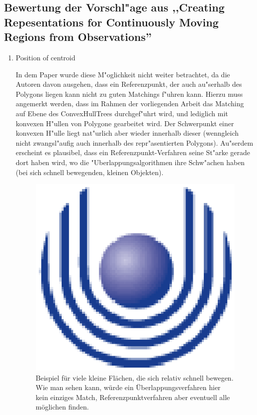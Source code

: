 \subsection[Bewertung der Vorschl"age aus \cite{TG}]{Bewertung der Vorschl"age aus ,,Creating Repesentations for Continuously Moving Regions from Observations''\cite{TG}}
\begin{enumerate}
\item Position of centroid

In dem Paper wurde diese M"oglichkeit nicht weiter betrachtet, da die Autoren davon ausgehen, dass ein Referenzpunkt, der auch au"serhalb des Polygons liegen kann nicht zu guten Matchings f"uhren kann. Hierzu muss angemerkt werden, dass im Rahmen der vorliegenden Arbeit das Matching auf Ebene des ConvexHullTrees durchgef"uhrt wird, und lediglich mit konvexen H"ullen von Polygone gearbeitet wird. Der Schwerpunkt einer konvexen H"ulle liegt nat"urlich aber wieder innerhalb dieser (wenngleich nicht zwangsl"aufig auch innerhalb des repr"asentierten Polygons). Au"serdem erscheint es plausibel, dass ein Referenzpunkt-Verfahren seine St"arke gerade dort haben wird, wo die "Uberlappungsalgorithmen ihre Schw"achen haben (bei sich schnell bewegenden, kleinen Objekten).

\begin{figure}
	\centering
	\includegraphics{feu_logo2.eps}
	\caption[Beispiel für den Vorteil von Referenzpunktverfahren]{Beispiel für viele kleine Flächen, die sich relativ schnell bewegen. Wie man sehen kann, würde ein Überlappungsverfahren hier kein einziges Match, Referenzpunktverfahren aber eventuell alle möglichen finden.}
	\label{fig:SchnelleBewegung}
\end{figure}



\end{enumerate}
